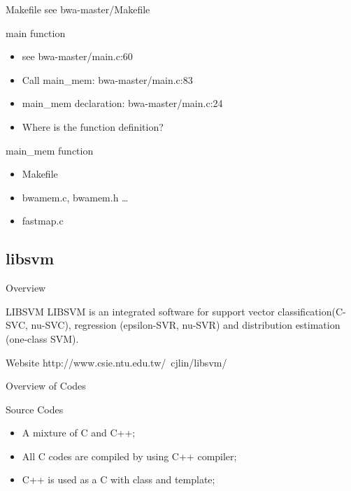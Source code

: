 \documentclass[UTF8]{beamer}
\begin{document}
\begin{frame}[t]{Makefile}
  see bwa-master/Makefile
\end{frame}

\begin{frame}[t]{main function}
  \begin{itemize}
    \item see bwa-master/main.c:60
    \item Call main_mem: bwa-master/main.c:83
    \item main_mem declaration: bwa-master/main.c:24
    \pause\item Where is the function definition?
  \end{itemize}

\end{frame}

\begin{frame}[t]{main_mem function}
\begin{itemize}
  \item Makefile
  \item bwamem.c, bwamem.h \ldots
  \pause \item fastmap.c
\end{itemize}
\end{frame}

\subsection{libsvm}

\begin{frame}[t]{Overview}
\begin{block}{LIBSVM}
  LIBSVM is an integrated software for support vector
  classification(C-SVC, nu-SVC), regression (epsilon-SVR, nu-SVR) and
  distribution estimation (one-class SVM).
\end{block}

\begin{block}{Website}
  http://www.csie.ntu.edu.tw/~cjlin/libsvm/
\end{block}
\end{frame}

\begin{frame}[t]{Overview of Codes}
  \begin{block}{Source Codes}
    \begin{itemize}
      \item A mixture of C and C++;
      \item All C codes are compiled by using C++ compiler;
      \item C++ is used as a C with class and template;
    \end{itemize}
  \end{block}
\end{frame}
\end{document}

